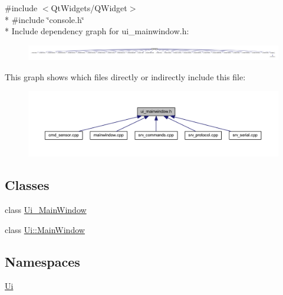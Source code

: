 {\ttfamily \#include $<$Qt\+Widgets/\+Q\+Widget$>$}\\*
{\ttfamily \#include \char`\"{}console.\+h\char`\"{}}\\*
Include dependency graph for ui\+\_\+mainwindow.\+h\+:
\nopagebreak
\begin{figure}[H]
\begin{center}
\leavevmode
\includegraphics[width=350pt]{d3/d29/a00419}
\end{center}
\end{figure}
This graph shows which files directly or indirectly include this file\+:
\nopagebreak
\begin{figure}[H]
\begin{center}
\leavevmode
\includegraphics[width=350pt]{db/d4f/a00420}
\end{center}
\end{figure}
\subsection*{Classes}
\begin{DoxyCompactItemize}
\item 
class \hyperlink{a00080}{Ui\+\_\+\+Main\+Window}
\item 
class \hyperlink{a00018}{Ui\+::\+Main\+Window}
\end{DoxyCompactItemize}
\subsection*{Namespaces}
\begin{DoxyCompactItemize}
\item 
 \hyperlink{a00145}{Ui}
\end{DoxyCompactItemize}
